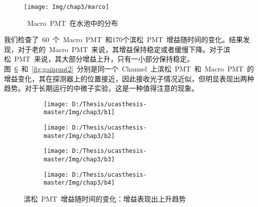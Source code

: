 \begin{figure}[!htb]
  \centering
   \texttt{[image: Img/chap3/marco]}
    \caption{~Macro~PMT~在水池中的分布}
  \label{fig:macro}
\end{figure}
我们检查了~60~个~Macro~PMT~和170个滨松~PMT~增益随时间的变化。结果发现，对于老的~Macro~PMT~来说，其增益保持稳定或者缓慢下降。对于滨松~PMT~来说，其大部分增益上升，只有一小部分保持稳定。图~\ref{fig:gainpmt1}~和~\ref{fig:gainpmt2}~分别是同一个~Channel~上滨松~PMT~和~Macro~PMT~的增益变化，其在探测器上的位置接近，因此接收光子情况近似，但明显表现出两种趋势。对于长期运行的中微子实验，这是一种值得注意的现象。
\begin{figure}[!htb]
  \centering
  \begin{subfigure}[b]{\MySubFactor\textwidth}
    \texttt{[image: D:/Thesis/ucasthesis-master/Img/chap3/b1]}
    \caption{}
    \label{fig:gainpmt1_1}
  \end{subfigure}%
  \begin{subfigure}[b]{\MySubFactor\textwidth}
    \texttt{[image: D:/Thesis/ucasthesis-master/Img/chap3/b2]}
    \caption{}
    \label{fig:gainpmt1_2}
  \end{subfigure}
   \begin{subfigure}[b]{\MySubFactor\textwidth}
    \texttt{[image: D:/Thesis/ucasthesis-master/Img/chap3/b3]}
    \caption{}
    \label{fig:gainpmt1_3}
  \end{subfigure}%
  \begin{subfigure}[b]{\MySubFactor\textwidth}
    \texttt{[image: D:/Thesis/ucasthesis-master/Img/chap3/b4]}
    \caption{}
    \label{fig:gainpmt1_4}
  \end{subfigure}
  \caption{滨松~PMT~增益随时间的变化：增益表现出上升趋势}
  \label{fig:gainpmt1}
\end{figure}

